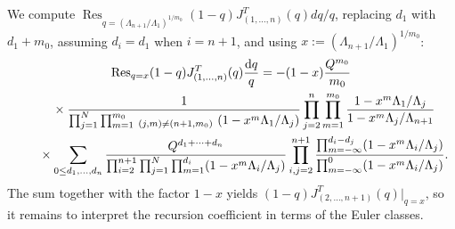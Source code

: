 \documentclass[10pt,a4paper]{amsart}
\numberwithin{equation}{section}
\def\Res{\operatorname{Res}}
\theoremstyle{definition}
\theoremstyle{plain}
\begin{document}
We compute $\Res_{q=(\Lambda_{n+1}/\Lambda_1)^{1/m_0}} (1-q)J^T_{(1,\dots,n)}(q)dq/q$, replacing $d_1$ with $d_1+m_0$, assuming $d_i=d_1$ when $i=n+1$, and using $x:= (\Lambda_{n+1}/\Lambda_1)^{1/m_0}$:
\begin{gather*}
\Res_{q=x} (1-q)J^T_{(1,\dots,n)}(q)\frac{{\rm d}q}{q} = -(1-x)\frac{Q^{m_0}}{m_0}
\\ \qquad
{}\times\frac{1}{\prod_{j=1}^N\prod_{m=1}^{m_0}\,_{(j,m)\neq (n+1,m_0)}\ (1-x^m\Lambda_1/\Lambda_j)} \prod_{j=2}^n\prod_{m=1}^{m_0}\frac{1-x^m\Lambda_1/\Lambda_j}{1-x^m\Lambda_j/\Lambda_{n+1}}
\\ \qquad
{}\times\sum_{0\leq d_1,\dots,d_n}\frac{Q^{d_1+\cdots+d_n}}{\prod_{i=2}^{n+1}\prod_{j=1}^N\prod_{m=1}^{d_i}
(1-x^m\Lambda_i/\Lambda_j)} \prod_{i,j=2}^{n+1}\frac{\prod_{m=-\infty}^{d_i-d_j}
(1-x^m\Lambda_i/\Lambda_j)}{\prod_{m=-\infty}^0(1-x^m\Lambda_i/\Lambda_j)}.
\end{gather*}
The sum together with the factor $1-x$ yields $(1-q)J^T_{(2,\dots,n+1)}(q)|_{q=x}$, so it remains to interpret the recursion coefficient in terms of the Euler classes.
\end{document}
